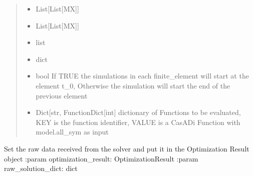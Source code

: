 \documentclass[letterpaper,10pt,english]{sphinxmanual}
\begin{document}
\begin{fulllineitems}
\begin{fulllineitems}
\begin{quote}
\begin{description}
\begin{itemize}
\item {} 
 \textendash{} List{[}List{[}MX{]}{]}

\item {} 
 \textendash{} List{[}List{[}MX{]}{]}

\item {} 
 \textendash{} list

\item {} 
 \textendash{} dict

\item {} 
 \textendash{} bool If TRUE the simulations in each finite\_element will start at the element t\_0,
Otherwise the simulation will start the end of the previous element

\item {} 
 \textendash{} Dict{[}str, Function\textbar{}Dict{[}int{]} dictionary of Functions to be evaluated, KEY is the function
identifier, VALUE is a CasADi Function with model.all\_sym as input

\end{itemize}

\end{description}\end{quote}

\end{fulllineitems}


\begin{fulllineitems}
\label{\detokenize{yaocptool.methods.classic:yaocptool.methods.classic.multipleshooting.MultipleShootingScheme.set_data_to_optimization_result_from_raw_data}}
Set the raw data received from the solver and put it in the Optimization Result object
:param optimization\_result: OptimizationResult
:param raw\_solution\_dict: dict

\end{fulllineitems}



\end{fulllineitems}
\end{document}
